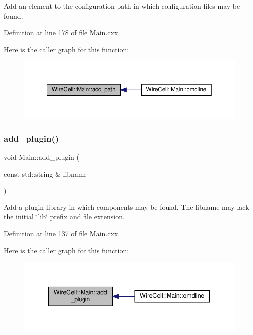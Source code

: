 Add an element to the configuration path in which configuration files may be found. 

Definition at line 178 of file Main.\+cxx.

Here is the caller graph for this function\+:
\nopagebreak
\begin{figure}[H]
\begin{center}
\leavevmode
\includegraphics[width=350pt]{class_wire_cell_1_1_main_a5747c7dd28185179cb961b37d1b55a48_icgraph}
\end{center}
\end{figure}
\mbox{\label{class_wire_cell_1_1_main_a198d57d515d756dc488dbc6ad5b14ccb}} 
\subsubsection{\texorpdfstring{add\+\_\+plugin()}{add\_plugin()}}
{\footnotesize\ttfamily void Main\+::add\+\_\+plugin (\begin{DoxyParamCaption}\item[{const std\+::string \&}]{libname }\end{DoxyParamCaption})}

Add a plugin library in which components may be found. The libname may lack the initial \char`\"{}lib\char`\"{} prefix and file extension. 

Definition at line 137 of file Main.\+cxx.

Here is the caller graph for this function\+:
\nopagebreak
\begin{figure}[H]
\begin{center}
\leavevmode
\includegraphics[width=340pt]{class_wire_cell_1_1_main_a198d57d515d756dc488dbc6ad5b14ccb_icgraph}
\end{center}
\end{figure}
\mbox{\label{class_wire_cell_1_1_main_a6c37e436a63876d242172070198e3192}} 
